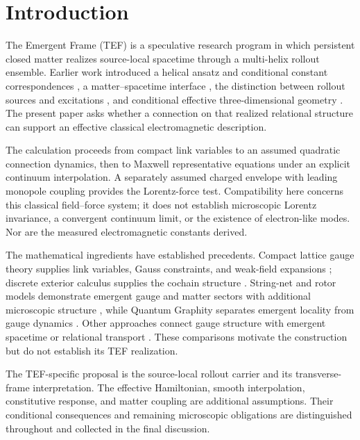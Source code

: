 \documentclass[11pt]{article}
\begin{document}
\section{Introduction}

The Emergent Frame (TEF) is a speculative research program in which persistent closed matter realizes source-local spacetime through a multi-helix rollout ensemble. Earlier work introduced a helical ansatz and conditional constant correspondences \cite{wu2026helical,wu2026fine}, a matter--spacetime interface \cite{wu2026interface}, the distinction between rollout sources and excitations \cite{wu2026minimal}, and conditional effective three-dimensional geometry \cite{wu2026geometry}. The present paper asks whether a connection on that realized relational structure can support an effective classical electromagnetic description.

The calculation proceeds from compact link variables to an assumed quadratic connection dynamics, then to Maxwell representative equations under an explicit continuum interpolation. A separately assumed charged envelope with leading monopole coupling provides the Lorentz-force test. Compatibility here concerns this classical field--force system; it does not establish microscopic Lorentz invariance, a convergent continuum limit, or the existence of electron-like modes. Nor are the measured electromagnetic constants derived.

The mathematical ingredients have established precedents. Compact lattice gauge theory supplies link variables, Gauss constraints, and weak-field expansions \cite{kogut1979}; discrete exterior calculus supplies the cochain structure \cite{desbrun2005dec}. String-net and rotor models demonstrate emergent gauge and matter sectors with additional microscopic structure \cite{levinwen2005,levinwen2006}, while Quantum Graphity separates emergent locality from gauge dynamics \cite{konopka2008}. Other approaches connect gauge structure with emergent spacetime or relational transport \cite{copinger2023,arneth2026}. These comparisons motivate the construction but do not establish its TEF realization.

The TEF-specific proposal is the source-local rollout carrier and its transverse-frame interpretation. The effective Hamiltonian, smooth interpolation, constitutive response, and matter coupling are additional assumptions. Their conditional consequences and remaining microscopic obligations are distinguished throughout and collected in the final discussion.
\end{document}
